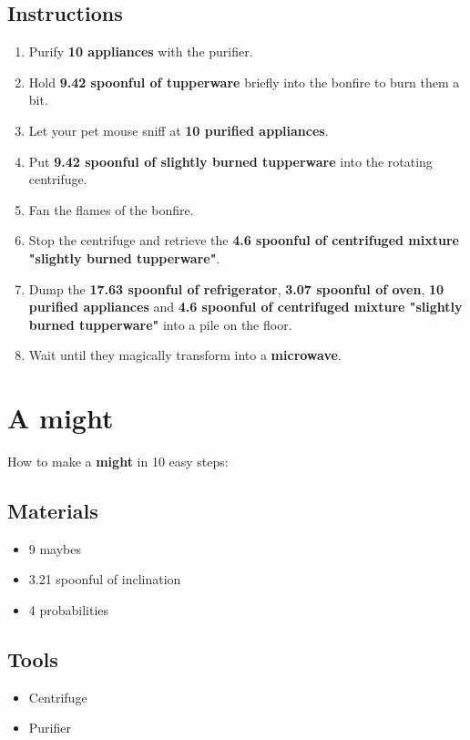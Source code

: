 \documentclass{article}
\begin{document}
\subsection{Instructions}\begin{enumerate}
\item 
Purify \textbf{10 appliances} with the purifier.
\item 
Hold \textbf{9.42 spoonful of tupperware} briefly into the bonfire to burn them a bit.
\item 
Let your pet mouse sniff at \textbf{10 purified appliances}.
\item 
Put \textbf{9.42 spoonful of slightly burned tupperware} into the rotating centrifuge.
\item 
Fan the flames of the bonfire.
\item 
Stop the centrifuge and retrieve the \textbf{4.6 spoonful of centrifuged mixture "slightly burned tupperware"}.
\item 
Dump the \textbf{17.63 spoonful of refrigerator}, \textbf{3.07 spoonful of oven}, \textbf{10 purified appliances} and \textbf{4.6 spoonful of centrifuged mixture "slightly burned tupperware"} into a pile on the floor.
\item 
Wait until they magically transform into a \textbf{microwave}.
\end{enumerate}
\newpage
\section{A might}How to make a \textbf{might} in 10 easy steps:

\subsection{Materials}\begin{itemize}
\item 
9 maybes
\item 
3.21 spoonful of inclination
\item 
4 probabilities
\end{itemize}
\subsection{Tools}\begin{itemize}
\item 
Centrifuge
\item 
Purifier
\end{itemize}
\end{document}
